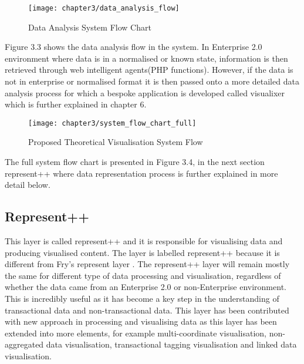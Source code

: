 \begin{figure}[H]
\centering
\texttt{[image: chapter3/data\_analysis\_flow]}
\caption{Data Analysis System Flow Chart}
\end{figure} 

Figure 3.3 shows the data analysis flow in the system. In Enterprise 2.0 environment where data is in a normalised or known state, information is then retrieved through web intelligent agents(PHP functions). However, if the data is not in enterprise or normalised format it is then passed onto a more detailed data analysis process for which a bespoke application is developed called visualixer which is further explained in chapter 6. 


\begin{figure}[H]
\centering
\texttt{[image: chapter3/system\_flow\_chart\_full]}
\caption{Proposed Theoretical Visualisation System Flow}
\end{figure} 

The full system flow chart is presented in Figure 3.4, in the next section represent++ where data representation process is further explained in more detail below.

\subsection{Represent++}

This layer is called represent++ and it is responsible for visualising data and producing visualised content. The layer is labelled represent++ because it is different from Fry's represent layer \cite{fry}. The represent++ layer will remain mostly the same for different type of data processing and visualisation, regardless of whether the data came from an Enterprise 2.0 or non-Enterprise environment. This is incredibly useful as it has become a key step in the understanding of transactional data and non-transactional data. This layer has been contributed with new approach in processing and visualising data as this layer has been extended into more elements, for example multi-coordinate visualisation, non-aggregated data visualisation, transactional tagging visualisation and linked data visualisation.

